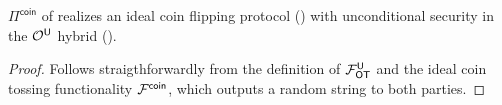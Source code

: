 \begin{lemma}\label{lem:OTtoC}
	$\Pi^{\textsf{coin}}$ of  realizes an ideal coin flipping protocol () with unconditional security  in the $\mathcal{O}^{\mathsf{U}}$ hybrid  ().
\end{lemma}
\begin{proof}
	Follows straigthforwardly from the definition of $\mathcal{F}_{\mathsf{OT}}^{\mathsf{U}}$ and the ideal coin tossing functionality $\mathcal{F}^{\mathsf{coin}}$, which outputs a random string to both parties.
	\pe
\end{proof}







% 

